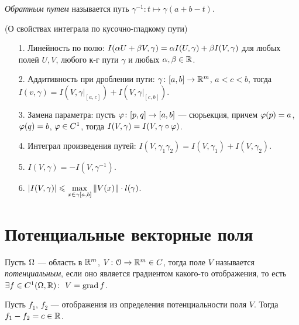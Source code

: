 \begin{definition}
    \textit{Обратным путем} называется путь $\gamma^{-1}: t \mapsto \gamma(a + b -
    t)$.
\end{definition}

\begin{theorem}(О свойствах интеграла по кусочно-гладкому пути)

    \begin{itemize}
        \item[1.] Линейность по полю:
            $I(\alpha U + \beta V, \gamma) = \alpha I(U, \gamma) + \beta I(V, \gamma)$ для любых
            полей $U, V$, любого к-г пути $\gamma$ и любых $\alpha, \beta \in \mathbb{R}$.
        \item[2.] Аддитивность при дроблении пути:
            $\gamma \colon [a, b] \to \mathbb{R}^m$, $a < c < b$, тогда \\
            $I(v, \gamma) = I(V, \gamma\big|_{[a, c]}) + I(V, \gamma\big|_{[c,
            b]})$.
        \item[3.] Замена параметра:
            пусть $\varphi \colon [p, q] \to [a, b]$ --- сюрьекция, причем $\varphi(p) = a$,
            $\varphi(q) = b$, $\varphi \in C^1$, тогда $I(V, \gamma) = I(V, \gamma \circ \varphi)$.
        \item[4.] Интеграл произведения путей:
            $I(V, \gamma_1 \gamma_2) = I(V, \gamma_1) + I(V, \gamma_2)$.
        \item[5.] $I(V, \gamma) = -I(V, \gamma^{-1})$.
        \item[6.] $\displaystyle |I(V, \gamma)| \leqslant \max_{x \in \gamma[a,
        b]}{\left\lVert V(x)\right\rVert} \cdot l(\gamma)$.
    \end{itemize}
\end{theorem}

\section{Потенциальные векторные поля}

\begin{definition}
    Пусть $\Omega$ --- область в $\mathbb{R}^m$, $V \colon \mathcal{O} \to \mathbb{R}^m \in C$, тогда поле
    $V$ называется \textit{потенциальным}, если оно является градиентом какого-то
    отображения, то есть $\exists f \in C^1(\Omega, \mathbb{R})\colon~ V = \operatorname{grad}
    f$.
\end{definition}

\begin{lemma}
    Пусть $f_1$, $f_2$ --- отображения из определения потенциальности поля $V$.
    Тогда $f_1 - f_2 = c \in \mathbb{R}$.
\end{lemma}

